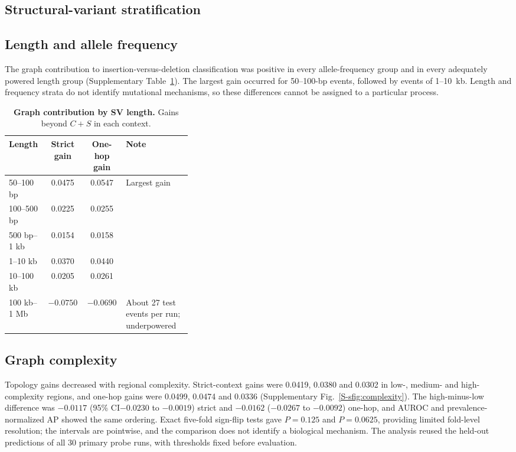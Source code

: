 \documentclass[11pt]{article}
\newcommand{\CI}{95\% CI\xspace}
\begin{document}
\begin{bibunit}[unsrtnat]
\section{Structural-variant stratification}
\label{S-snote:svstrata}

\subsection{Length and allele frequency}
The graph contribution to insertion-versus-deletion classification was positive in every allele-frequency group and in every adequately powered length group (Supplementary Table~\ref{S-stab:svlength}). The largest gain occurred for 50--100-bp events, followed by events of 1--10~kb. Length and frequency strata do not identify mutational mechanisms, so these differences cannot be assigned to a particular process.

\begin{table}[H]
\centering
\caption{\textbf{Graph contribution by SV length.} Gains beyond $C+S$ in each context.}
\label{S-stab:svlength}
\small
\begin{tabular}{@{}lccp{0.36\linewidth}@{}}
\toprule
Length & Strict gain & One-hop gain & Note \\
\midrule
50--100 bp & 0.0475 & 0.0547 & Largest gain \\
100--500 bp & 0.0225 & 0.0255 & \\
500 bp--1 kb & 0.0154 & 0.0158 & \\
1--10 kb & 0.0370 & 0.0440 & \\
10--100 kb & 0.0205 & 0.0261 & \\
100 kb--1 Mb & $-0.0750$ & $-0.0690$ & About 27 test events per run; underpowered \\
\bottomrule
\end{tabular}
\end{table}

\subsection{Graph complexity}
Topology gains decreased with regional complexity. Strict-context gains were 0.0419, 0.0380 and 0.0302 in low-, medium- and high-complexity regions, and one-hop gains were 0.0499, 0.0474 and 0.0336 (Supplementary Fig.~\ref{S-sfig:complexity}). The high-minus-low difference was $-0.0117$ (\CI $-0.0230$ to $-0.0019$) strict and $-0.0162$ ($-0.0267$ to $-0.0092$) one-hop, and AUROC and prevalence-normalized AP showed the same ordering. Exact five-fold sign-flip tests gave $P=0.125$ and $P=0.0625$, providing limited fold-level resolution; the intervals are pointwise, and the comparison does not identify a biological mechanism. The analysis reused the held-out predictions of all 30 primary probe runs, with thresholds fixed before evaluation.


\end{bibunit}
\end{document}
